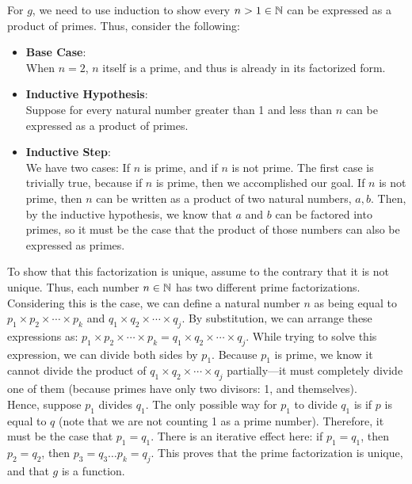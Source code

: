 {                \noindent For \(g\), we need to use induction to show every \(n > 1 \in \mathbb{N}\) can be expressed as a product of primes. Thus, consider the following: 
                \begin{itemize}
                    \item \textbf{Base Case}: \\
                    When \(n = 2\), \(n\) itself is a prime, and thus is already in its factorized form. 
                    \item \textbf{Inductive Hypothesis}: \\
                    Suppose for every natural number greater than 1 and less than \(n\) can be expressed as a product of primes. 
                    \item \textbf{Inductive Step}: \\
                    We have two cases: If \(n\) is prime, and if \(n\) is not prime. The first case is trivially true, because if \(n\) is prime, then we accomplished our goal. If \(n\) is not prime, then \(n\) can be written as a product of two natural numbers, \(a,b\). Then, by the inductive hypothesis, we know that \(a\) and \(b\) can be factored into primes, so it must be the case that the product of those numbers can also be expressed as primes.
                \end{itemize}
                To show that this factorization is unique, assume to the contrary that it is not unique. Thus, each number \(n \in \mathbb{N}\) has two different prime factorizations. Considering this is the case, we can define a natural number \(n\) as being equal to \(p_1 \times p_2 \times \cdots \times p_k\) and \(q_1 \times q_2 \times \cdots \times q_j\). By substitution, we can arrange these expressions as: \(p_1 \times p_2 \times \cdots \times p_k = q_1 \times q_2 \times \cdots \times q_j\). While trying to solve this expression, we can divide both sides by \(p_1\). Because \(p_1\) is prime, we know it cannot divide the product of \(q_1 \times q_2 \times \cdots \times q_j\) partially---it must completely divide one of them (because primes have only two divisors: 1, and themselves). \\

                \noindent Hence, suppose \(p_1\) divides \(q_1\). The only possible way for \(p_1\) to divide \(q_1\) is if \(p\) is equal to \(q\) (note that we are not counting 1 as a prime number). Therefore, it must be the case that \(p_1 = q_1\). There is an iterative effect here: if \(p_1 = q_1\), then \(p_2 = q_2\), then \(p_3 = q_3 \dots p_k = q_j\). This proves that the prime factorization is unique, and that \(g\) is a function. \\

}
